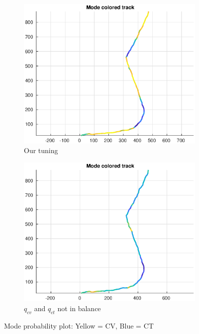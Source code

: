 \begin{figure}
    \centering
    \hspace*{-2cm}\begin{adjustbox}{minipage=\linewidth, scale=1}
        \begin{subfigure}{.5\textwidth}
            \includegraphics[width=\linewidth]{plots/task22_modeprob.eps} 
            \caption{Our tuning}
            \label{fig:task22_modeprob_tuned}
        \end{subfigure}
        \begin{subfigure}{.5\textwidth}
            \includegraphics[width=\linewidth]{plots/task22_modeprob_highcv.eps} 
            \caption{$q_{cv}$ and $q_{ct}$ not in balance}
            \label{fig:task22_modeprob_highcv}
        \end{subfigure}
    \end{adjustbox}
        \caption{Mode probability plot: Yellow = CV, Blue = CT}
        \label{fig:task22_modeprob}
\end{figure}


